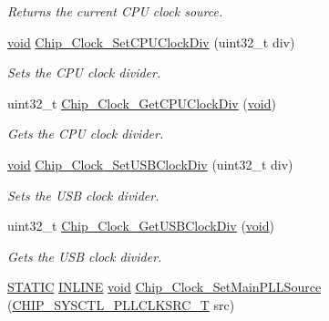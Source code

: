 \begin{DoxyCompactItemize}
\begin{DoxyCompactList}\small\item\em Returns the current C\-P\-U clock source. \end{DoxyCompactList}\item 
\hyperlink{Paradigm_2Tern__EE_2small_2portmacro_8h_a14d32f8130d3c0b212cfc751730b5b49}{void} \hyperlink{group__CLOCK__17XX__40XX_gaf88a9722800b98c3ea3cccb572c54230}{Chip\-\_\-\-Clock\-\_\-\-Set\-C\-P\-U\-Clock\-Div} (uint32\-\_\-t div)
\begin{DoxyCompactList}\small\item\em Sets the C\-P\-U clock divider. \end{DoxyCompactList}\item 
uint32\-\_\-t \hyperlink{group__CLOCK__17XX__40XX_ga3e1ef8ac1f9c19b33016c914b01fd9a4}{Chip\-\_\-\-Clock\-\_\-\-Get\-C\-P\-U\-Clock\-Div} (\hyperlink{Paradigm_2Tern__EE_2small_2portmacro_8h_a14d32f8130d3c0b212cfc751730b5b49}{void})
\begin{DoxyCompactList}\small\item\em Gets the C\-P\-U clock divider. \end{DoxyCompactList}\item 
\hyperlink{Paradigm_2Tern__EE_2small_2portmacro_8h_a14d32f8130d3c0b212cfc751730b5b49}{void} \hyperlink{group__CLOCK__17XX__40XX_gae63a884704ec0b314373e34165f62963}{Chip\-\_\-\-Clock\-\_\-\-Set\-U\-S\-B\-Clock\-Div} (uint32\-\_\-t div)
\begin{DoxyCompactList}\small\item\em Sets the U\-S\-B clock divider. \end{DoxyCompactList}\item 
uint32\-\_\-t \hyperlink{group__CLOCK__17XX__40XX_ga5852bdb5470a03988aaae8c68e3fb5fd}{Chip\-\_\-\-Clock\-\_\-\-Get\-U\-S\-B\-Clock\-Div} (\hyperlink{Paradigm_2Tern__EE_2small_2portmacro_8h_a14d32f8130d3c0b212cfc751730b5b49}{void})
\begin{DoxyCompactList}\small\item\em Gets the U\-S\-B clock divider. \end{DoxyCompactList}\item 
\hyperlink{group__LPC__Types__Public__Macros_ga10b2d890d871e1489bb02b7e70d9bdfb}{S\-T\-A\-T\-I\-C} \hyperlink{group__LPC__Types__Public__Types_ga2eb6f9e0395b47b8d5e3eeae4fe0c116}{I\-N\-L\-I\-N\-E} \hyperlink{Paradigm_2Tern__EE_2small_2portmacro_8h_a14d32f8130d3c0b212cfc751730b5b49}{void} \hyperlink{group__CLOCK__17XX__40XX_gadeba4ec298c7ad2cf1627f9add199d02}{Chip\-\_\-\-Clock\-\_\-\-Set\-Main\-P\-L\-L\-Source} (\hyperlink{group__CLOCK__17XX__40XX_gacda7fd6d13922330ce9344dbc4ec85b7}{C\-H\-I\-P\-\_\-\-S\-Y\-S\-C\-T\-L\-\_\-\-P\-L\-L\-C\-L\-K\-S\-R\-C\-\_\-\-T} src)

\end{DoxyCompactItemize}
